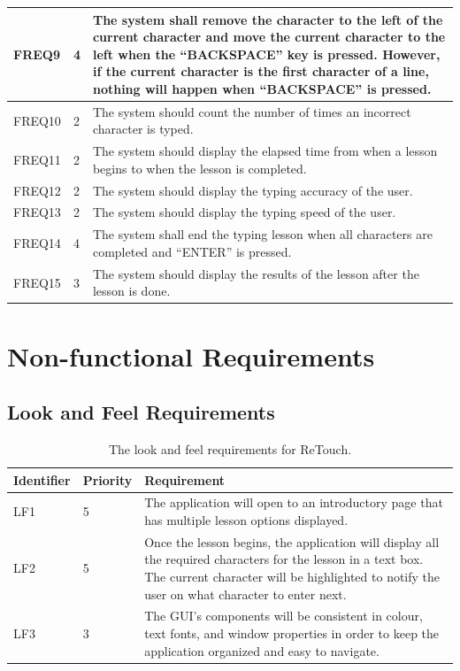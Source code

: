 \documentclass[12pt, titlepage]{article}
\begin{document}
\begin{longtable}{ |m{2cm}|m{1.8cm}|m{9.4cm}| }
    \hline
    FREQ9 & 4 & The system shall remove the character to the left of the current character and move the current character to the left when the “BACKSPACE” key is pressed. However, if the current character is the first character of a line, nothing will happen when “BACKSPACE” is pressed. \\ 
    \hline
    FREQ10 & 2 & The system should count the number of times an incorrect character is typed. \\ 
    \hline
    FREQ11 & 2 & The system should display the elapsed time from when a lesson begins to when the lesson is completed. \\ 
    \hline
    FREQ12 & 2 & The system should display the typing accuracy of the user. \\ 
    \hline
    FREQ13 & 2 & The system should display the typing speed of the user. \\ 
    \hline
    FREQ14 & 4 & The system shall end the typing lesson when all characters are completed and “ENTER” is pressed. \\ 
    \hline
    FREQ15 & 3 & {\color{cyan}The system should display the results of the lesson after the lesson is done. }\\ 
    \hline

\end{longtable}

\section{Non-functional Requirements}
\subsection{Look and Feel Requirements}

\begin{table}[H]
  \caption{The look and feel requirements for ReTouch.}
\begin{tabular}{ |m{2cm}|m{1.8cm}|m{9.4cm}| }
    \hline
    \textbf{Identifier} & \textbf{Priority} & \textbf{Requirement} \\ 
    \hline
    {\color{cyan}LF1} & 5 & The application will open to an introductory page that has multiple lesson options displayed. \\ 
    \hline
    {\color{cyan}LF2} & 5 & Once the lesson begins, the application will display all the required characters for the lesson in a text box. The current character will be highlighted to notify the user on what character to enter next. \\ 
    \hline
    {\color{cyan}LF3} & 3 & The GUI's components will be consistent in colour, text fonts, and window properties in order to keep the application organized and easy to navigate. \\ 
    \hline
\end{tabular}
\end{table}
\end{document}
